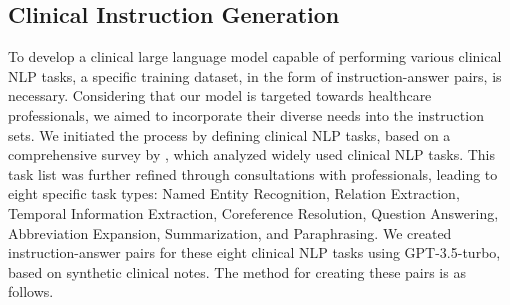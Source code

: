 \documentclass[11pt]{article}
\begin{document}
\begin{table}[h]
    \centering
    \setlength{\heavyrulewidth}{1.5pt}
\end{table}





\subsection{Clinical Instruction Generation} \label{2.2}




To develop a clinical large language model capable of performing various clinical NLP tasks, a specific training dataset, in the form of instruction-answer pairs, is necessary. 
Considering that our model is targeted towards healthcare professionals, we aimed to incorporate their diverse needs into the instruction sets. 
We initiated the process by defining clinical NLP tasks, based on a comprehensive survey by \citet{wu2022survey}, which analyzed widely used clinical NLP tasks. 
This task list was further refined through consultations with professionals, leading to eight specific task types: Named Entity Recognition, Relation Extraction, Temporal Information Extraction, Coreference Resolution, Question Answering, Abbreviation Expansion, Summarization, and Paraphrasing. 
We created instruction-answer pairs for these eight clinical NLP tasks using GPT-3.5-turbo, based on synthetic clinical notes. 
The method for creating these pairs is as follows.
\end{document}
